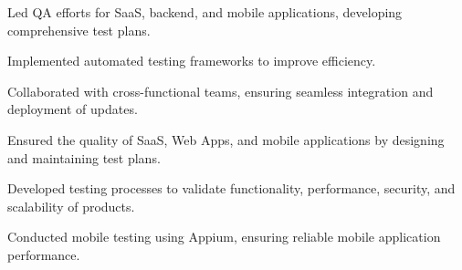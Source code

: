 \documentclass[hmargin=1.25cm, vmargin=0.75cm, scale=0.92]{deedy-resume-openfont}
\begin{document}
\begin{minipage}[t]{0.66\textwidth}
\begin{tightemize}
\item Led QA efforts for SaaS, backend, and mobile applications, developing comprehensive test plans.
\item Implemented automated testing frameworks to improve efficiency.
\item Collaborated with cross-functional teams, ensuring seamless integration and deployment of updates.
\end{tightemize}

\begin{tightemize}
\item Ensured the quality of SaaS, Web Apps, and mobile applications by designing and maintaining test plans.
\item Developed testing processes to validate functionality, performance, security, and scalability of products.
\item Conducted mobile testing using Appium, ensuring reliable mobile application performance.
\end{tightemize}

\end{minipage}
\end{document}
